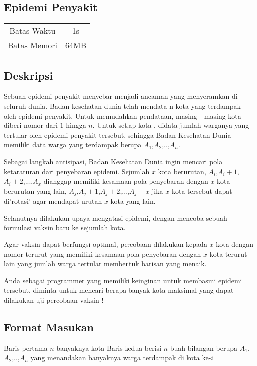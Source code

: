 \documentclass{article}
\begin{document}
\begin{center}
    \section*{Epidemi Penyakit} %

    \begin{tabular}{ | c c | }
        \hline
        Batas Waktu  & 1s \\    %
        Batas Memori & 64MB \\  %
        \hline
    \end{tabular}
\end{center}

\subsection*{Deskripsi}

Sebuah epidemi penyakit menyebar menjadi ancaman yang menyeramkan di seluruh dunia.
Badan kesehatan dunia telah mendata n kota yang terdampak oleh epidemi penyakit.
Untuk memudahkan pendataan, masing - masing kota diberi nomor dari $1$ hingga $n$. 
Untuk setiap kota , didata jumlah warganya yang tertular oleh epidemi penyakit tersebut, sehingga Badan Kesehatan Dunia memiliki data warga yang terdampak berupa $A_1$,$A_2$,..,$A_n$.

Sebagai langkah antisipasi, Badan Kesehatan Dunia ingin mencari pola ketaraturan dari penyebaran epidemi.
Sejumlah $x$ kota berurutan, $A_i$,$A_i+1$,$A_i+2$,...,$A_x$ dianggap memiliki kesamaan pola penyebaran dengan $x$ kota berurutan yang lain, $A_j$,$A_j+1$,$A_j+2$,...,$A_j+x$ jika 
$x$ kota tersebut dapat di'rotasi' agar mendapat urutan $x$ kota yang lain.

Selanutnya dilakukan upaya mengatasi epidemi, dengan mencoba sebuah formulasi vaksin baru ke sejumlah kota.

Agar vaksin dapat berfungsi optimal, percobaan dilakukan kepada $x$ kota dengan nomor terurut yang memiliki kesamaan pola penyebaran dengan $x$ kota terurut lain yang jumlah warga tertular membentuk barisan yang menaik.

Anda sebagai programmer yang memiliki keinginan untuk membasmi epidemi tersebut, 
diminta untuk mencari berapa banyak kota maksimal yang dapat dilakukan uji percobaan vaksin !

\subsection*{Format Masukan}
Baris pertama $n$ banyaknya kota 
Baris kedua berisi $n$ buah bilangan berupa $A_1$,$A_2$,..,$A_n$ yang menandakan banyaknya warga terdampak di kota ke-$i$
\end{document}
